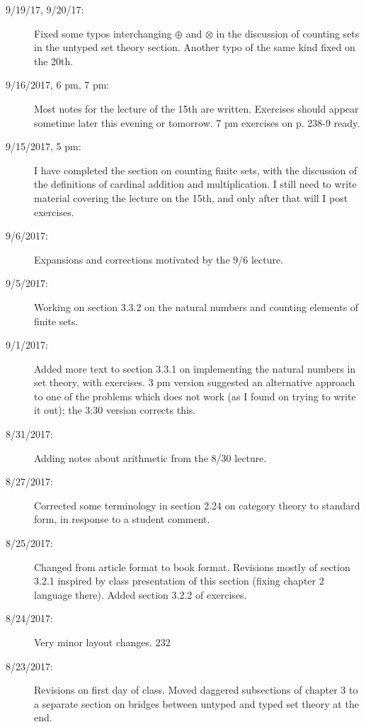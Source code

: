 \documentclass[12pt]{book}
\begin{document}
{\begin{description}
\item[9/19/17, 9/20/17:]  Fixed some typos interchanging $\oplus$ and $\otimes$ in the discussion of counting sets in the untyped set theory section.  Another typo of the same kind fixed on the 20th.

\item[9/16/2017, 6 pm, 7 pm:]  Most notes for the lecture of the 15th are written.  Exercises should appear sometime later this evening or tomorrow.  7 pm exercises on p. 238-9 ready.

\item[9/15/2017, 5 pm:]  I have completed the section on counting finite sets, with the discussion of the definitions of cardinal addition and multiplication.  I still need to write material covering the lecture on the 15th, and only after that will I post exercises.

\item[9/6/2017:]  Expansions and corrections motivated by the 9/6 lecture.

\item[9/5/2017:]  Working on section 3.3.2 on the natural numbers and counting elements of finite sets.

\item[9/1/2017:]  Added more text to section 3.3.1 on implementing the natural numbers in set theory, with exercises.  3 pm version suggested an alternative approach to one of the problems which does not work (as I found on trying to write it out);  the 3:30 version corrects this.

\item[8/31/2017:]  Adding notes about arithmetic from the 8/30 lecture.

\item[8/27/2017:]  Corrected some terminology in section 2.24 on category theory to standard form, in response to a student comment.

\item[8/25/2017:]  Changed from article format to book format.  Revisions mostly of section 3.2.1 inspired by class presentation of this section (fixing chapter 2 language there).  Added section 3.2.2 of exercises.

\item[8/24/2017:]  Very minor layout changes.
232
\item[8/23/2017:]  Revisions on first day of class.  Moved daggered subsections of chapter 3 to a separate section on bridges between untyped and typed set theory at the end.


\end{description}}
\end{document}
